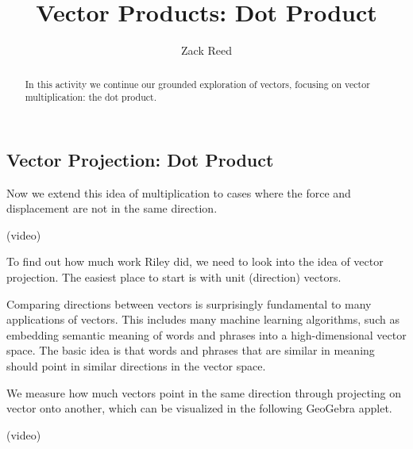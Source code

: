 \documentclass{ximera}
\title{Vector Products: Dot Product}
\author{Zack Reed}
\begin{document}
\begin{abstract}
In this activity we continue our grounded exploration of vectors, focusing on vector multiplication: the dot product.
\end{abstract}
\maketitle


\subsection*{Vector Projection: Dot Product}

Now we extend this idea of multiplication to cases where the force and displacement are not in the same direction.

(video)

To find out how much work Riley did, we need to look into the idea of vector projection. The easiest place to start is with unit (direction) vectors.

Comparing directions between vectors is surprisingly fundamental to many applications of vectors. This includes many machine learning algorithms, such as embedding semantic meaning of words and phrases into a high-dimensional vector space. The basic idea is that words and phrases that are similar in meaning should point in similar directions in the vector space. 

We measure how much vectors point in the same direction through projecting on vector onto another, which can be visualized in the following GeoGebra applet.

(video)

\begin{center}
\end{center}
\end{document}
